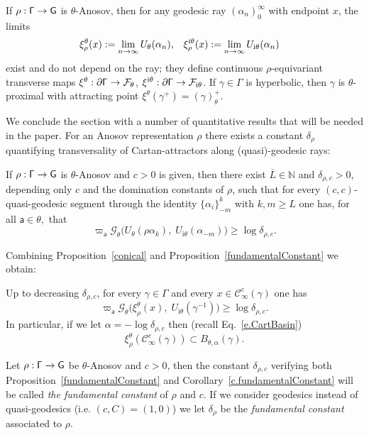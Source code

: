 \documentclass[AHL,Unicode,longabstracts,MathTools]{cedram}
\newcommand{\ii}{\mathrm{i}}
\renewcommand{\sf}[1]{{\mathsf{#1}}}
\newcommand{\sroot}{{\sf{a}}}
\newcommand{\sfG}{\sf{G}}
\newcommand{\G}{\sf{\Gamma}}
\newcommand{\cal}{\mathcal}
\newcommand{\Gr}{\cal{G}}
\newcommand{\cone}{\cal{C}}
\newcommand{\calF}{\mathcal{F}}
\newcommand{\N}{\mathbb{N}}
\newcommand{\g}{\gamma}
\renewcommand{\t}{\theta}
\newcommand{\bord}{\partial}
\newcommand{\peso}{\varpi}
\newcommand{\ov}{\overline}
\renewcommand{\/}{\backslash}
\newcommand{\<}{\langle}
\renewcommand{\>}{\rangle}
\renewcommand*{\to}{\mathchoice{\longrightarrow}{\rightarrow}{\rightarrow}{\rightarrow}}
\begin{document}
\begin{prop}\label{conical}
If $\rho:\G\to\sfG$ is $\t$-Anosov, then for any geodesic ray $(\alpha_n)_0^\infty$ with endpoint $x$, the limits
\begin{align*}
&\xi^\t_\rho(x):=\lim_{n\to\infty}U_\t(\alpha_n),  &&\xi^{\ii\t}_\rho(x):=\lim_{n\to\infty}U_{\ii\t}(\alpha_n)
\end{align*}
exist and do not depend on the ray; they define continuous $\rho$-equivariant transverse maps $\xi^{\t}:\bord\G\to\calF_\t$, $\xi^{\ii\t}:\bord\G\to\calF_{\ii\t}$. If $\g\in\G$ is hyperbolic, then $\g$ is $\t$-proximal with attracting point $\xi^\t(\g^+)=(\g)_\t^+$.
\end{prop}


We conclude the section with a number of quantitative results that will be needed in the paper. For an Anosov representation $\rho$ there exists a constant $\delta_\rho$ quantifying transversality of Cartan-attractors along (quasi)-geodesic rays:

\begin{prop}
\label{fundamentalConstant}
If $\rho:\G\to\sfG$ is $\t$-Anosov and $c>0$ is given, then there exist $\ov L\in\N$ and $\delta_{\rho,c}>0$, depending only $c$ and the domination constants of $\rho$, such that for every $(c,c)$-quasi-geodesic segment through the identity $\{\alpha_i\}_{-m}^k$ with $k,m\geq L$ one has, for all $\sroot\in\t, $ that
\[
\peso_\sroot\Gr_\t\bigl(U_\t(\rho\alpha_k), \;U_{\ii\t}(\alpha_{-m})\bigr)\geq\log\delta_{\rho,c}.
\]
\end{prop}

Combining Proposition~\ref{conical} and Proposition~\ref{fundamentalConstant} we obtain:
\begin{coro}\label{c.fundamentalConstant}
Up to decreasing $\delta_{\rho,c}$, for every $\g\in\G$ and every $x\in\cone_\infty^c(\g)$ one has
\[
\peso_\sroot\Gr_\t\bigl(\xi^\t_\rho(x),\;U_{\ii\t}(\g^{-1})\bigr)\geq\log\delta_{\rho,c}.
\]
In particular, if we let $\alpha=-\log\delta_{\rho,c}$ then (recall Eq.~\eqref{e.CartBasin})
\begin{equation}\label{e.conesinCartan}
\xi^\theta_\rho(\cone_{\infty}^{c}(\g))\subset B_{\theta,\alpha}(\g).
\end{equation}
\end{coro}

\begin{defi}\label{FConstant}
Let $\rho:\G\to\sfG$ be $\t$-Anosov and $c>0$, then the constant $\delta_{\rho,c}$ verifying both Proposition~\ref{fundamentalConstant} and Corollary~\ref{c.fundamentalConstant} will be called \emph{the fundamental constant} of $\rho$ and $c$. If we consider geodesics instead of quasi-geodesics (i.e. $(c,C)=(1,0)$) we let $\delta_\rho$ be the \emph{fundamental constant} associated to $\rho$.
\end{defi}
\end{document}
